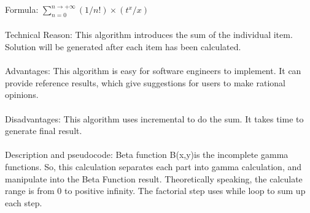\documentclass{article} \usepackage{mathtools} \usepackage{algorithm}
\begin{document}
\State Formula:  $ \sum_{n=0}^{n \to +\infty}( 1/n!) \times( t^x / x) $ \\ \\
Technical Reason: This algorithm introduces the sum of the individual item. Solution will be generated after each item has been calculated. \\ \\
 Advantages: This algorithm is easy for software engineers to implement. It can provide reference results, which give suggestions for users to make rational opinions.  \\ \\
 Disadvantages: This algorithm uses incremental to do the sum. It takes time to generate final result. \\ \\
Description and pseudocode:
Beta function B(x,y)is the incomplete gamma functions. So, this calculation separates each part into gamma calculation, and manipulate into the Beta Function result. Theoretically speaking, the calculate range is from 0 to positive infinity. The factorial step uses while loop to sum up each step. \\ \\ \\ 
\end{document}
